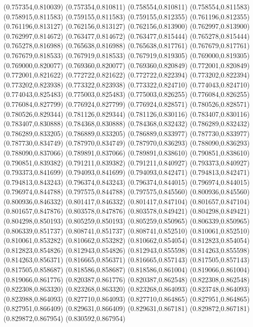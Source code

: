 (0.757354,0.810039)
(0.757354,0.810811)
(0.758554,0.810811)
(0.758554,0.811583)
(0.758915,0.811583)
(0.759155,0.811583)
(0.759155,0.812355)
(0.761196,0.812355)
(0.761196,0.813127)
(0.762156,0.813127)
(0.762156,0.813900)
(0.762997,0.813900)
(0.762997,0.814672)
(0.763477,0.814672)
(0.763477,0.815444)
(0.765278,0.815444)
(0.765278,0.816988)
(0.765638,0.816988)
(0.765638,0.817761)
(0.767679,0.817761)
(0.767679,0.818533)
(0.767919,0.818533)
(0.767919,0.819305)
(0.769000,0.819305)
(0.769000,0.820077)
(0.769360,0.820077)
(0.769360,0.820849)
(0.772001,0.820849)
(0.772001,0.821622)
(0.772722,0.821622)
(0.772722,0.822394)
(0.773202,0.822394)
(0.773202,0.823938)
(0.773322,0.823938)
(0.773322,0.824710)
(0.774043,0.824710)
(0.774043,0.825483)
(0.775003,0.825483)
(0.775003,0.826255)
(0.776084,0.826255)
(0.776084,0.827799)
(0.776924,0.827799)
(0.776924,0.828571)
(0.780526,0.828571)
(0.780526,0.829344)
(0.781126,0.829344)
(0.781126,0.830116)
(0.783407,0.830116)
(0.783407,0.830888)
(0.784368,0.830888)
(0.784368,0.832432)
(0.786289,0.832432)
(0.786289,0.833205)
(0.786889,0.833205)
(0.786889,0.833977)
(0.787730,0.833977)
(0.787730,0.834749)
(0.787970,0.834749)
(0.787970,0.836293)
(0.788090,0.836293)
(0.788090,0.837066)
(0.789891,0.837066)
(0.789891,0.838610)
(0.790851,0.838610)
(0.790851,0.839382)
(0.791211,0.839382)
(0.791211,0.840927)
(0.793373,0.840927)
(0.793373,0.841699)
(0.794093,0.841699)
(0.794093,0.842471)
(0.794813,0.842471)
(0.794813,0.843243)
(0.796374,0.843243)
(0.796374,0.844015)
(0.796974,0.844015)
(0.796974,0.844788)
(0.797575,0.844788)
(0.797575,0.845560)
(0.800936,0.845560)
(0.800936,0.846332)
(0.801417,0.846332)
(0.801417,0.847104)
(0.801657,0.847104)
(0.801657,0.847876)
(0.803578,0.847876)
(0.803578,0.849421)
(0.804298,0.849421)
(0.804298,0.850193)
(0.805259,0.850193)
(0.805259,0.850965)
(0.806339,0.850965)
(0.806339,0.851737)
(0.808741,0.851737)
(0.808741,0.852510)
(0.810061,0.852510)
(0.810061,0.853282)
(0.810662,0.853282)
(0.810662,0.854054)
(0.812823,0.854054)
(0.812823,0.854826)
(0.812943,0.854826)
(0.812943,0.855598)
(0.814263,0.855598)
(0.814263,0.856371)
(0.816665,0.856371)
(0.816665,0.857143)
(0.817505,0.857143)
(0.817505,0.858687)
(0.818586,0.858687)
(0.818586,0.861004)
(0.819066,0.861004)
(0.819066,0.861776)
(0.820387,0.861776)
(0.820387,0.862548)
(0.822308,0.862548)
(0.822308,0.863320)
(0.823268,0.863320)
(0.823268,0.864093)
(0.823748,0.864093)
(0.823988,0.864093)
(0.827710,0.864093)
(0.827710,0.864865)
(0.827951,0.864865)
(0.827951,0.866409)
(0.829631,0.866409)
(0.829631,0.867181)
(0.829872,0.867181)
(0.829872,0.867954)
(0.830592,0.867954)
